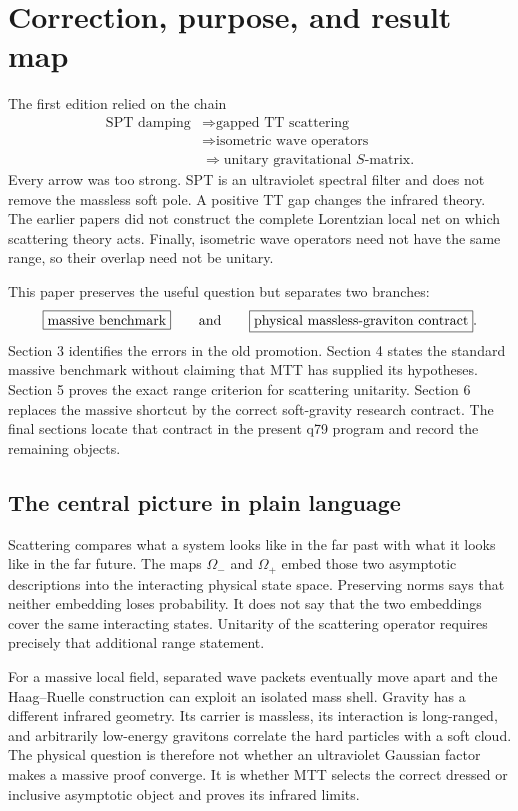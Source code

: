 \documentclass[11pt]{article}
\newcommand{\OmIn}{\Omega_{-}}
\newcommand{\OmOut}{\Omega_{+}}
\begin{document}
\tableofcontents

\section{Correction, purpose, and result map}

The first edition relied on the chain
\[
\begin{aligned}
 \text{SPT damping}
 &\Longrightarrow \text{gapped TT scattering}\\
 &\Longrightarrow \text{isometric wave operators}\\
 &\Longrightarrow \text{unitary gravitational }S\text{-matrix}.
\end{aligned}
\]
Every arrow was too strong. SPT is an ultraviolet spectral filter and does not
remove the massless soft pole. A positive TT gap changes the infrared theory.
The earlier papers did not construct the complete Lorentzian local net on
which scattering theory acts. Finally, isometric wave operators need not have
the same range, so their overlap need not be unitary.

This paper preserves the useful question but separates two branches:
\[
\boxed{\text{massive benchmark}}
\qquad\hbox{and}\qquad
\boxed{\text{physical massless-graviton contract}}.
\]
Section 3 identifies the errors in the old promotion. Section 4 states the
standard massive benchmark without claiming that MTT has supplied its
hypotheses. Section 5 proves the exact range criterion for scattering
unitarity. Section 6 replaces the massive shortcut by the correct soft-gravity
research contract. The final sections locate that contract in the present q79
program and record the remaining objects.

\subsection{The central picture in plain language}

Scattering compares what a system looks like in the far past with what it
looks like in the far future. The maps $\OmIn$ and $\OmOut$ embed those two
asymptotic descriptions into the interacting physical state space. Preserving
norms says that neither embedding loses probability. It does not say that the
two embeddings cover the same interacting states. Unitarity of the scattering
operator requires precisely that additional range statement.

For a massive local field, separated wave packets eventually move apart and
the Haag--Ruelle construction can exploit an isolated mass shell. Gravity has
a different infrared geometry. Its carrier is massless, its interaction is
long-ranged, and arbitrarily low-energy gravitons correlate the hard
particles with a soft cloud. The physical question is therefore not whether
an ultraviolet Gaussian factor makes a massive proof converge. It is whether
MTT selects the correct dressed or inclusive asymptotic object and proves its
infrared limits.
\end{document}
